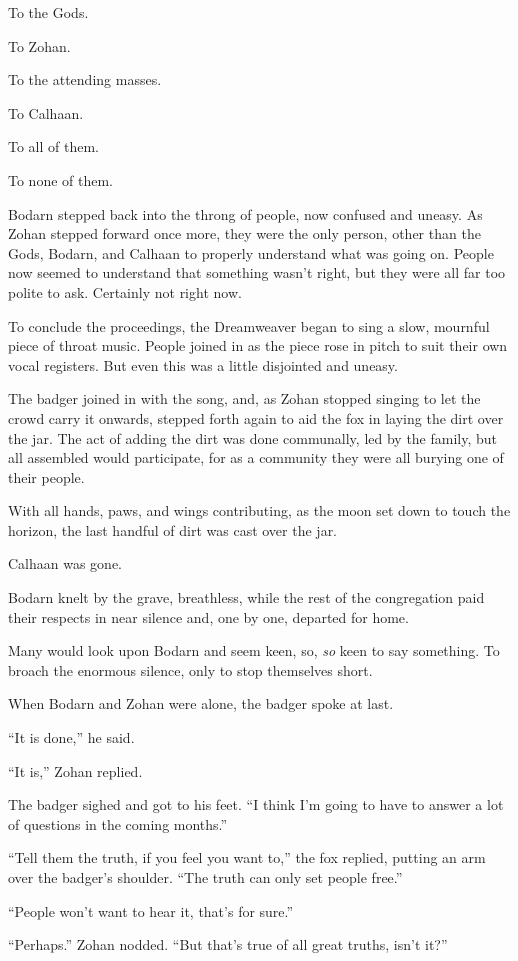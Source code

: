 To the Gods.

To Zohan.

To the attending masses.

To Calhaan.

To all of them.

To none of them.

Bodarn stepped back into the throng of people, now confused and uneasy. As Zohan stepped forward once more, they were the only person, other than the Gods, Bodarn, and Calhaan to properly understand what was going on. People now seemed to understand that something wasn't right, but they were all far too polite to ask. Certainly not right now.

To conclude the proceedings, the Dreamweaver began to sing a slow, mournful piece of throat music. People joined in as the piece rose in pitch to suit their own vocal registers. But even this was a little disjointed and uneasy.

The badger joined in with the song, and, as Zohan stopped singing to let the crowd carry it onwards, stepped forth again to aid the fox in laying the dirt over the jar. The act of adding the dirt was done communally, led by the family, but all assembled would participate, for as a community they were all burying one of their people.

With all hands, paws, and wings contributing, as the moon set down to touch the horizon, the last handful of dirt was cast over the jar.

Calhaan was gone.

Bodarn knelt by the grave, breathless, while the rest of the congregation paid their respects in near silence and, one by one, departed for home.

Many would look upon Bodarn and seem keen, so, \emph{so} keen to say something. To broach the enormous silence, only to stop themselves short.

When Bodarn and Zohan were alone, the badger spoke at last.

``It is done,'' he said.

``It is,'' Zohan replied.

The badger sighed and got to his feet. ``I think I'm going to have to answer a lot of questions in the coming months.''

``Tell them the truth, if you feel you want to,'' the fox replied, putting an arm over the badger's shoulder. ``The truth can only set people free.''

``People won't want to hear it, that's for sure.''

``Perhaps.'' Zohan nodded. ``But that's true of all great truths, isn't it?''
